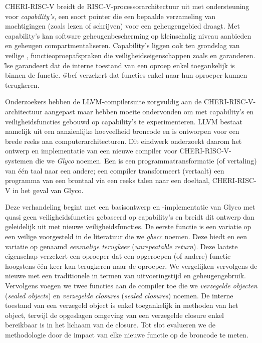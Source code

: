 \documentclass[main.tex]{subfiles}
\begin{document}
\begin{abstract*}
	CHERI-RISC-V breidt de RISC-V-processorarchitectuur uit met ondersteuning voor \emph{capability's}, een soort pointer die een bepaalde verzameling van machtigingen (zoals lezen of schrijven) voor een geheugengebied draagt. Met capability's kan software geheugenbescherming op kleinschalig niveau aanbieden en geheugen compartmentaliseren. Capability's liggen ook ten grondslag van veilige , functieoproepafspraken die veiligheidseigenschappen zoals \emph{} en \emph{} garanderen. \G{lse} garandeert dat de interne toestand van een oproep enkel toegankelijk is binnen de functie. \G{wbcf} verzekert dat functies enkel naar hun oproeper kunnen terugkeren.
	
	Onderzoekers hebben de LLVM-compilersuite zorgvuldig aan de CHERI-RISC-V-architectuur aangepast maar hebben moeite ondervonden om met capability's en veiligheidsfuncties gebouwd op capability's te experimenteren. LLVM bestaat namelijk uit een aanzienlijke hoeveelheid broncode en is ontworpen voor een brede reeks aan computerarchitecturen. Dit eindwerk onderzoekt daarom het ontwerp en implementatie van een nieuwe compiler voor CHERI-RISC-V-systemen die we \emph{Glyco} noemen. Een  is een programmatransformatie (of vertaling) van één taal naar een andere; een compiler transformeert (vertaalt) een programma van een brontaal via een reeks talen naar een doeltaal, CHERI-RISC-V in het geval van Glyco.
	
	Deze verhandeling begint met een basisontwerp en -implementatie van Glyco met quasi geen veiligheidsfuncties gebaseerd op capability's en breidt dit ontwerp dan geleidelijk uit met nieuwe veiligheidsfuncties. De eerste functie is een variatie op een veilige  voorgesteld in de literatuur die we \emph{\acrshort{ghscc}} noemen. Deze  biedt  en een variatie op  genaamd \emph{eenmalige terugkeer} (\emph{unrepeatable return}). Deze laatste eigenschap verzekert een oproeper dat een opgeroepen (of andere) functie hoogstens één keer kan terugkeren naar de oproeper. We vergelijken vervolgens de nieuwe  met een traditionele in termen van uitvoeringstijd en geheugengebruik. Vervolgens voegen we twee functies aan de compiler toe die we \emph{verzegelde objecten} (\emph{sealed objects}) en \emph{verzegelde closures} (\emph{sealed closures}) noemen. De interne toestand van een verzegeld object is enkel toegankelijk in methoden van het object, terwijl de opgeslagen omgeving van een verzegelde closure enkel bereikbaar is in het lichaam van de closure. Tot slot evalueren we de methodologie door de impact van elke nieuwe functie op de broncode te meten.
\end{abstract*}

\onlyinsubfile{\mainmatter{}\glsaddall\printglossaries}
\end{document}
